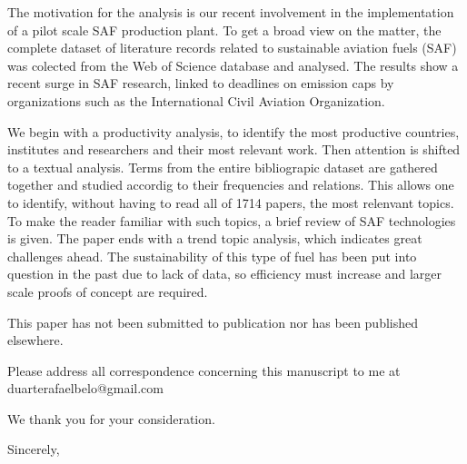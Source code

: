 \documentclass[12pt]{letter} %
\begin{document}
\begin{letter}
The motivation for the analysis is our recent involvement in the implementation of a pilot scale SAF production plant. To get a broad view on the matter, the complete dataset of literature records related to sustainable aviation fuels (SAF) was colected from the Web of Science database and analysed. The results show a recent surge in SAF research, linked to deadlines on emission caps by organizations such as the International Civil Aviation Organization.

We begin with a productivity analysis, to identify the most productive countries, institutes and researchers and their most relevant work. Then attention is shifted to a textual analysis. Terms from the entire bibliograpic dataset are gathered together and studied accordig to their frequencies and relations. This allows one to identify, without having to read all of 1714 papers, the most relenvant topics. To make the reader familiar with such topics, a brief review of SAF technologies is given. The paper ends with a trend topic analysis, which indicates great challenges ahead. The sustainability of this type of fuel has been put into question in the past due to lack of data, so efficiency must increase and larger scale proofs of concept are required.


This paper has not been submitted to publication nor has been published elsewhere.

Please address all correspondence concerning this manuscript to me at \\
duarterafaelbelo@gmail.com

We thank you for your consideration.

\closing{Sincerely,}




\end{letter}
\end{document}
